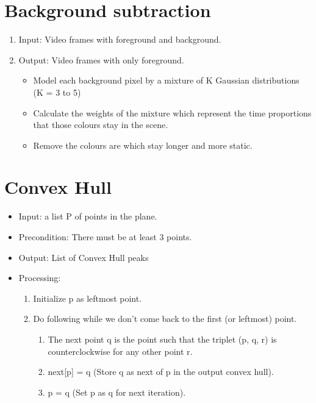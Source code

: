 \documentclass{scrreprt}
\begin{document}
\section{Background subtraction}
\begin{enumerate}
    \item Input: Video frames with foreground and background.
    \item Output: Video frames with only foreground. 
    \begin{itemize}
        \item Model each background pixel by a mixture of K Gaussian distributions (K = 3 to 5)
        \item Calculate the weights of the mixture which represent the time proportions that those colours stay in the scene.
        \item Remove the colours are which stay longer and more static.
    \end{itemize}
\end{enumerate}
\section{Convex Hull}
\begin{itemize}
    \item Input: a list P of points in the plane.
    \item Precondition: There must be at least 3 points.
    \item Output: List of Convex Hull peaks
    \item Processing:
    \begin{enumerate}
        \item Initialize p as leftmost point.
        \item Do following while we don’t come back to the first (or leftmost) point.
        \begin{enumerate}
            \item The next point q is the point such that the triplet (p, q, r) is counterclockwise for any other point r.
            \item next[p] = q (Store q as next of p in the output convex hull).
            \item p = q (Set p as q for next iteration).
        \end{enumerate}
    \end{enumerate}
\end{itemize}
\end{document}
